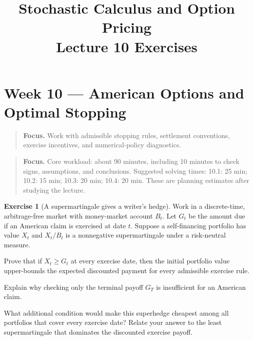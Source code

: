 \documentclass[11pt]{article}
\title{Stochastic Calculus and Option Pricing\\Lecture 10 Exercises}
\author{}
\date{}
\theoremstyle{definition}
\newtheorem{exercise}{Exercise}[section]
\newcommand{\lecturesummary}[1]{\begin{quote}\small\textbf{Focus.} #1\end{quote}}
\begin{document}
\maketitle
\vspace{-1.2em}
\setcounter{section}{9}
\fi

\section{Week 10 --- American Options and Optimal Stopping}
\lecturesummary{Work with admissible stopping rules, settlement conventions, exercise incentives, and numerical-policy diagnostics.}

\ifIncludeCore

\lecturesummary{Core workload: about 90 minutes, including 10 minutes to check signs, assumptions, and conclusions. Suggested solving times: 10.1: 25 min; 10.2: 15 min; 10.3: 20 min; 10.4: 20 min. These are planning estimates after studying the lecture.}
\setcounter{exercise}{0}
\begin{exercise}[A supermartingale gives a writer's hedge]
Work in a discrete-time, arbitrage-free market with money-market account
\(B_t\). Let \(G_t\) be the amount due if an American claim is exercised at
date \(t\). Suppose a self-financing portfolio has value \(X_t\) and
\(X_t/B_t\) is a nonnegative supermartingale under a risk-neutral measure.
\begin{exparts}
  \item Prove that if \(X_t\geq G_t\) at every exercise date, then the
  initial portfolio value upper-bounds the expected discounted payment for
  every admissible exercise rule.
  \item Explain why checking only the terminal payoff \(G_T\) is
  insufficient for an American claim.
  \item What additional condition would make this superhedge cheapest among
  all portfolios that cover every exercise date? Relate your answer to the
  least supermartingale that dominates the discounted exercise payoff.
\end{exparts}
\end{exercise}
\end{document}
